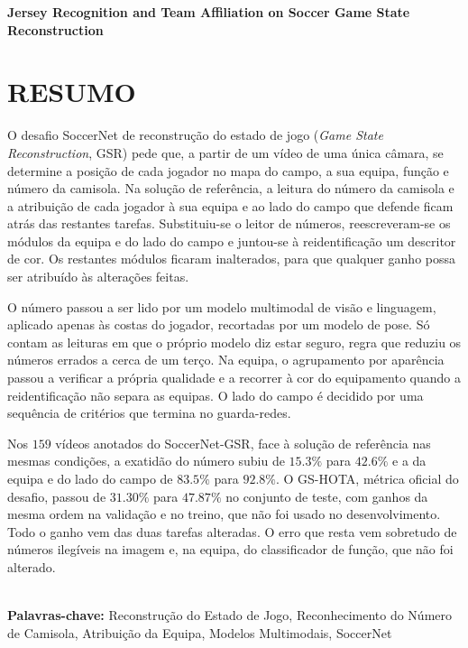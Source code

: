 \begingroup
\begin{flushleft}
\bfseries
{}
{\Large
Jersey Recognition and Team Affiliation on Soccer Game State Reconstruction}

\mdseries
\end{flushleft}
\normalsize
\let\clearpage\relax
\chapter{RESUMO}
\endgroup

\noindent O desafio SoccerNet de reconstrução do estado de jogo (\emph{Game State Reconstruction}, GSR)
pede que, a partir de um vídeo de uma única câmara, se determine a posição de cada jogador no
mapa do campo, a sua equipa, função e número da camisola. Na solução de referência, a leitura do número da camisola e a atribuição de cada jogador à sua
equipa e ao lado do campo que defende ficam atrás das restantes tarefas. Substituiu-se o leitor de
números, reescreveram-se os módulos da equipa e do lado do campo e juntou-se à reidentificação um
descritor de cor. Os restantes módulos ficaram inalterados, para que qualquer ganho
possa ser atribuído às alterações feitas.

O número passou a ser lido por um modelo multimodal de visão e linguagem, aplicado apenas às costas
do jogador, recortadas por um modelo de pose. Só contam as leituras em que o próprio modelo
diz estar seguro, regra que reduziu os números errados a cerca de um terço. Na equipa, o
agrupamento por aparência passou a verificar a própria qualidade e a recorrer à cor do
equipamento quando a reidentificação não separa as equipas. O lado do campo é decidido por uma
sequência de critérios que termina no guarda-redes.

Nos $159$ vídeos anotados do SoccerNet-GSR, face à solução de referência nas mesmas condições,
a exatidão do número subiu de $15.3\%$ para $42.6\%$ e a da equipa e do lado do
campo de $83.5\%$ para $92.8\%$. O GS-HOTA, métrica oficial do desafio, passou de
$31.30\%$ para $47.87\%$ no conjunto de teste, com ganhos da mesma ordem na validação e no
treino, que não foi usado no desenvolvimento. Todo o ganho vem das duas tarefas alteradas. O erro que
resta vem sobretudo de números ilegíveis na imagem e, na equipa, do classificador de função, que não
foi alterado.

\hspace{3cm}\\
\indent
\textbf{Palavras-chave: } Reconstrução do Estado de Jogo, Reconhecimento do Número de Camisola,
Atribuição da Equipa, Modelos Multimodais, SoccerNet

